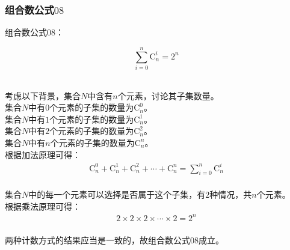 \documentclass[UTF8]{ctexart}
\begin{document}
\newpage

\subsubsection{组合数公式$08$}
    组合数公式$08$：
    \begin{large}
        \begin{equation*}
            \sum_{i=0}^n\mathrm{C}_n^i=2^n
        \end{equation*}
    \end{large}\\
    考虑以下背景，集合$N$中含有$n$个元素，讨论其子集数量。\\[5mm]
    集合$N$中有$0$个元素的子集的数量为$\mathrm{C}_n^0$。\\[3mm]
    集合$N$中有$1$个元素的子集的数量为$\mathrm{C}_n^1$。\\[3mm]
    集合$N$中有$2$个元素的子集的数量为$\mathrm{C}_n^2$。\\[3mm]
    集合$N$中有$n$个元素的子集的数量为$\mathrm{C}_n^n$。\\[3mm]
    根据加法原理可得：
    \setcounter{equation}{0}
    \begin{align}
        \mathrm{C}_n^0+\mathrm{C}_n^1+\mathrm{C}_n^2+\cdots+\mathrm{C}_n^n=\sum_{i=0}^n\mathrm{C}_n^i
    \end{align}\\
    集合$N$中的每一个元素可以选择是否属于这个子集，有$2$种情况，共$n$个元素。\\[3mm]
    根据乘法原理可得：
    \begin{align}
        2\times 2\times 2\times\cdots\times 2=2^n
    \end{align}\\
    两种计数方式的结果应当是一致的，故组合数公式$08$成立。

\newpage
\end{document}
